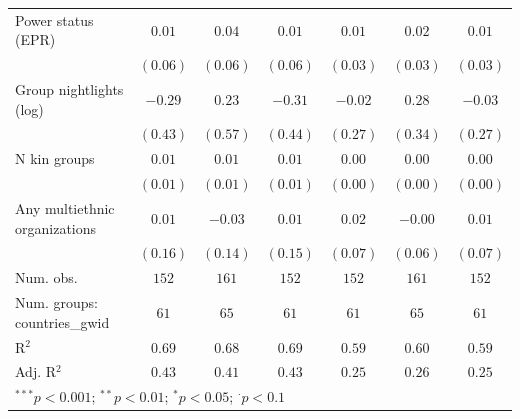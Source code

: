 \begin{tabular}{l c c c c c c}
Power status (EPR)                & $0.01$          & $0.04$      & $0.01$          & $0.01$   & $0.02$      & $0.01$   \\
                                  & $(0.06)$        & $(0.06)$    & $(0.06)$        & $(0.03)$ & $(0.03)$    & $(0.03)$ \\
Group nightlights (log)           & $-0.29$         & $0.23$      & $-0.31$         & $-0.02$  & $0.28$      & $-0.03$  \\
                                  & $(0.43)$        & $(0.57)$    & $(0.44)$        & $(0.27)$ & $(0.34)$    & $(0.27)$ \\
N kin groups                      & $0.01$          & $0.01$      & $0.01$          & $0.00$   & $0.00$      & $0.00$   \\
                                  & $(0.01)$        & $(0.01)$    & $(0.01)$        & $(0.00)$ & $(0.00)$    & $(0.00)$ \\
Any multiethnic organizations     & $0.01$          & $-0.03$     & $0.01$          & $0.02$   & $-0.00$     & $0.01$   \\
                                  & $(0.16)$        & $(0.14)$    & $(0.15)$        & $(0.07)$ & $(0.06)$    & $(0.07)$ \\
\hline
Num. obs.                         & $152$           & $161$       & $152$           & $152$    & $161$       & $152$    \\
Num. groups: countries\_gwid      & $61$            & $65$        & $61$            & $61$     & $65$        & $61$     \\
R$^2$                             & $0.69$          & $0.68$      & $0.69$          & $0.59$   & $0.60$      & $0.59$   \\
Adj. R$^2$                        & $0.43$          & $0.41$      & $0.43$          & $0.25$   & $0.26$      & $0.25$   \\
\hline
\multicolumn{7}{l}{\scriptsize{$^{***}p<0.001$; $^{**}p<0.01$; $^{*}p<0.05$; $^{\cdot}p<0.1$}}
\end{tabular}
